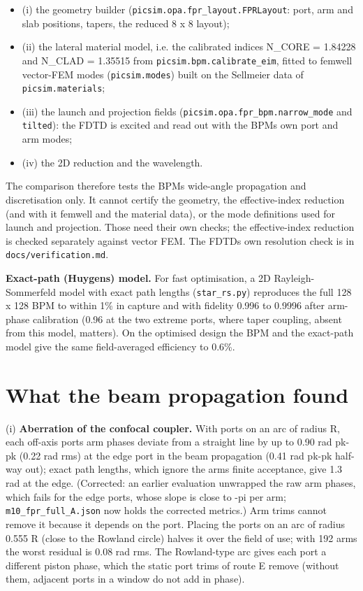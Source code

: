 \begin{itemize}
\tightlist
\item
  (i) the geometry builder (\texttt{picsim.opa.fpr\_layout.FPRLayout}:
  port, arm and slab positions, tapers, the reduced 8 x 8 layout);
\item
  (ii) the lateral material model, i.e. the calibrated indices N\_CORE =
  1.84228 and N\_CLAD = 1.35515 from \texttt{picsim.bpm.calibrate\_eim},
  fitted to femwell vector-FEM modes (\texttt{picsim.modes}) built on
  the Sellmeier data of \texttt{picsim.materials};
\item
  (iii) the launch and projection fields
  (\texttt{picsim.opa.fpr\_bpm.narrow\_mode} and \texttt{tilted}): the
  FDTD is excited and read out with the BPM\textquotesingle s own port
  and arm modes;
\item
  (iv) the 2D reduction and the wavelength.
\end{itemize}

The comparison therefore tests the BPM\textquotesingle s wide-angle
propagation and discretisation only. It cannot certify the geometry, the
effective-index reduction (and with it femwell and the material data),
or the mode definitions used for launch and projection. Those need their
own checks; the effective-index reduction is checked separately against
vector FEM. The FDTD\textquotesingle s own resolution check is in
\texttt{docs/verification.md}.

\textbf{Exact-path (Huygens) model.} For fast optimisation, a 2D
Rayleigh-Sommerfeld model with exact path lengths (\texttt{star\_rs.py})
reproduces the full 128 x 128 BPM to within 1\% in capture and with
fidelity 0.996 to 0.9996 after arm-phase calibration (0.96 at the two
extreme ports, where taper coupling, absent from this model, matters).
On the optimised design the BPM and the exact-path model give the same
field-averaged efficiency to 0.6\%.

\hypertarget{3-what-the-beam-propagation-found}{%
\section{What the beam propagation
found}\label{fpr_design-3-what-the-beam-propagation-found}}

(i) \textbf{Aberration of the confocal coupler.} With ports on an arc of
radius R, each off-axis port\textquotesingle s arm phases deviate from a
straight line by up to 0.90 rad pk-pk (0.22 rad rms) at the edge port in
the beam propagation (0.41 rad pk-pk half-way out); exact path lengths,
which ignore the arms\textquotesingle{} finite acceptance, give 1.3 rad
at the edge. (Corrected: an earlier evaluation unwrapped the raw arm
phases, which fails for the edge ports, whose slope is close to -pi per
arm; \texttt{m10\_fpr\_full\_A.json} now holds the corrected metrics.)
Arm trims cannot remove it because it depends on the port. Placing the
ports on an arc of radius 0.555 R (close to the Rowland circle) halves
it over the field of use; with 192 arms the worst residual is 0.08 rad
rms. The Rowland-type arc gives each port a different piston phase,
which the static port trims of route E remove (without them, adjacent
ports in a window do not add in phase).

